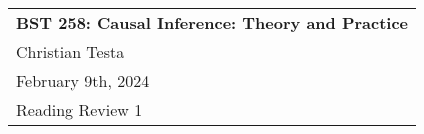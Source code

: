 \documentclass[a4paper,11pt]{article}
\begin{document}
\thispagestyle{empty} %

\begin{tabular}{p{6.5in}}  
{\bf BST 258: Causal Inference: Theory and Practice} \\
Christian Testa\\ February 9th, 2024\\
Reading Review 1\\
\hline 
\end{tabular} 

\nocite{*}

\vspace*{0.25in}


\printbibliography
\end{document}
